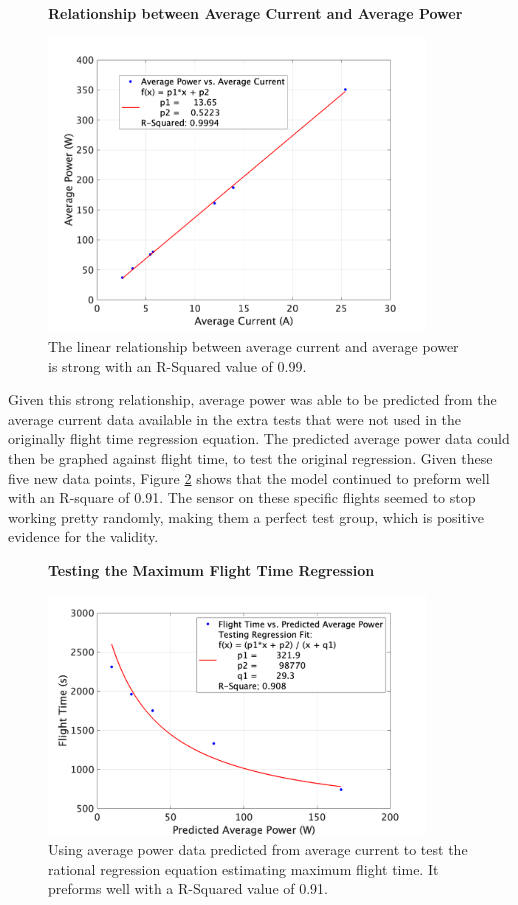 \documentclass{article}
\begin{document}
\begin{figure}[!h]
  \centering
  \large{\textbf{Relationship between Average Current and Average Power}}\par
  \includegraphics[width = 100mm]{images/CurrToPwr.png}
  \caption{The linear relationship between average current and average power is strong with an R-Squared value of 0.99.}
  \label{fig:currtopwr}
\end{figure}

Given this strong relationship, average power was able to be predicted from the average current data available in the extra tests that were not used in the originally flight time regression equation. The predicted average power data could then be graphed against flight time, to test the original regression. Given these five new data points, Figure \ref{fig:usingpredictedpower} shows that the model continued to preform well with an R-square of 0.91. The sensor on these specific flights seemed to stop working pretty randomly, making them a perfect test group, which is positive evidence for the validity.

\begin{figure}[!h]
  \centering
  \large{\textbf{Testing the Maximum Flight Time Regression}}\par
  \includegraphics[width = 100mm]{images/UsingPredictedPower.png}
  \caption{Using average power data predicted from average current to test the rational regression equation estimating maximum flight time. It preforms well with a R-Squared value of 0.91.}
  \label{fig:usingpredictedpower}
\end{figure}
\end{document}

